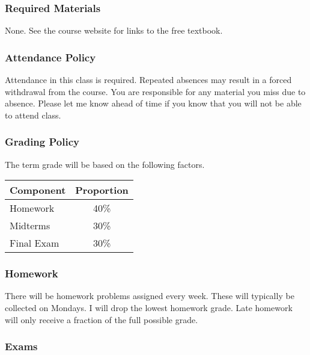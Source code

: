 \documentclass[10pt]{article}
\begin{document}
\subsubsection*{Required Materials}

None.  See the course website for links to the free textbook.


\subsubsection*{Attendance Policy}

Attendance in this class is required. Repeated absences may result in a forced withdrawal from the course. You are responsible for any material you miss due to absence. Please let me know ahead of time if you know that you will not be able to attend class.

\subsubsection*{Grading Policy}

The term grade will be based on the following factors.

\begin{center}
\begin{tabular}{|l|c|}
\hline
Component      & Proportion \\ \hline
Homework  & 40\% \\
Midterms  & 30\% \\
Final Exam  & 30\% \\ \hline
\end{tabular}
\end{center}

\subsubsection*{Homework}

There will be homework problems assigned every week. These will typically be collected on Mondays. I will drop the lowest homework grade. Late homework will only receive a fraction of the full possible grade.

\subsubsection*{Exams}
\end{document}
